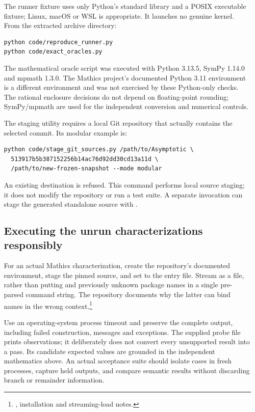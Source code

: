 \documentclass[11pt,letterpaper]{article}
\newcommand{\code}[1]{\texttt{\detokenize{#1}}}
\newcommand{\src}[2]{\footnote{\cite{#1}, #2.}}
\begin{document}
The runner fixture uses only Python's standard library and a POSIX executable fixture; Linux, macOS or WSL is appropriate. It launches no genuine kernel. From the extracted archive directory:
\begin{lstlisting}
python code/reproduce_runner.py
python code/exact_oracles.py
\end{lstlisting}
The mathematical oracle script was executed with Python 3.13.5, SymPy 1.14.0 and mpmath 1.3.0. The Mathics project's documented Python 3.11 environment is a different environment and was not exercised by these Python-only checks. The rational enclosure decisions do not depend on floating-point rounding; SymPy/mpmath are used for the independent conversion and numerical controls.

The staging utility requires a local Git repository that actually contains the selected commit. Its modular example is:
\begin{lstlisting}
python code/stage_git_sources.py /path/to/Asymptotic \
  513917b5b387152256b14ac76d92dd30cd13a11d \
  /path/to/new-frozen-snapshot --mode modular
\end{lstlisting}
An existing destination is refused. This command performs local source staging; it does not modify the repository or run a test suite. A separate invocation can stage the generated standalone source with \code{--mode standalone}.

\subsection{Executing the unrun characterizations responsibly}

For an actual Mathics characterization, create the repository's documented environment, stage the pinned source, and set \code{ASYMPTOTIC_AUDIT_SOURCE} to the entry file. Stream  as a file, rather than putting \code{Get} and previously unknown package names in a single pre-parsed command string. The repository documents why the latter can bind names in the wrong context.\src{compat}{installation and streaming-load notes}

Use an operating-system process timeout and preserve the complete output, including failed construction, messages and exceptions. The supplied probe file prints observations; it deliberately does not convert every unsupported result into a pass. Its candidate expected values are grounded in the independent mathematics above. An actual acceptance suite should isolate cases in fresh processes, capture held outputs, and compare semantic results without discarding branch or remainder information.
\end{document}
